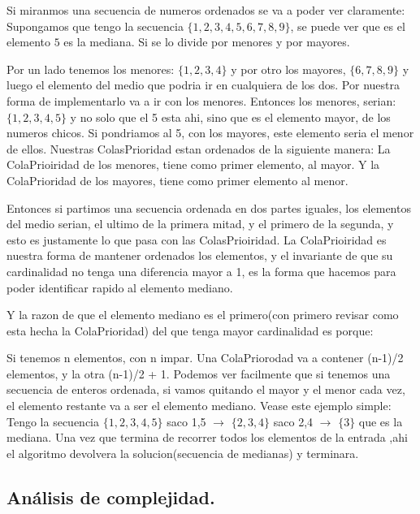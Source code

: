 Si miranmos una secuencia de numeros ordenados se va a poder ver claramente:
Supongamos que tengo la secuencia $\{1,2,3,4,5,6,7,8,9\}$, se puede ver que es el elemento $5$ es la mediana. \newline
Si se lo divide por menores y por mayores.

Por un lado tenemos los menores: $\{1,2,3,4\}$ y por otro los mayores, $\{6,7,8,9\}$
y luego el elemento del medio que podria ir en cualquiera de los dos. Por nuestra forma de implementarlo va a ir con los menores.
Entonces los menores, serian: $\{1,2,3,4,5\}$ y no solo que el 5 esta ahi, sino que es el elemento mayor, de los numeros chicos.
Si pondriamos al 5, con los mayores, este elemento seria el menor de ellos.
Nuestras ColasPrioridad estan ordenados de la siguiente manera: La ColaPrioiridad de los menores, tiene como primer elemento, al mayor. Y la ColaPrioridad de los mayores, tiene como primer elemento al menor.

Entonces si partimos una secuencia ordenada en dos partes iguales, los elementos del medio serian, el ultimo de la primera mitad, y el primero de la segunda, y esto es justamente lo que pasa con las ColasPrioiridad.
La ColaPrioiridad es nuestra forma de mantener ordenados los elementos, y el invariante de que su cardinalidad no tenga una diferencia mayor a 1, es la forma que hacemos para poder identificar rapido al elemento mediano.

Y la razon de que el elemento mediano es el primero(con primero revisar como esta hecha la ColaPrioridad) del que tenga mayor cardinalidad es porque:

Si tenemos n elementos, con n impar. Una ColaPriorodad va a contener (n-1)/2 elementos, y la otra (n-1)/2 + 1.
Podemos ver facilmente que si tenemos una secuencia de enteros ordenada, si vamos quitando el mayor y el menor cada vez, el elemento restante va a ser el elemento mediano.\newline
Vease este ejemplo simple:
Tengo la secuencia $\{1,2,3,4,5\}$  saco 1,5 $\rightarrow$  $\{2,3,4\}$  saco 2,4 $\rightarrow$ $\{3\}$ que es la mediana. \newline
Una vez que termina de recorrer todos los elementos de la entrada ,ahi el algoritmo devolvera la solucion(secuencia de medianas) y terminara.

\newpage
\subsection{Análisis de complejidad.}

